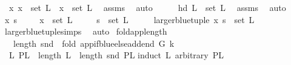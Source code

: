 \begin{isabellebody}
\ {\isachardoublequoteopen}\ {\isasymAnd}x{\isachardot}{\kern0pt}\ x\ {\isasymin}\ set\ L\ {\isasymLongrightarrow}\ x\ {\isasymin}\ set\ L{\isachardoublequoteclose}\ \isamarkupfalse%
\ assms\ \isamarkupfalse%
\ auto\isanewline
{}\isamarkupfalse%
\ \isanewline
\ \ \isamarkupfalse%
\ {\isachardoublequoteopen}hd\ L\ {\isasymin}\ set\ L{\isachardoublequoteclose}\ \isamarkupfalse%
\ assms\ \isamarkupfalse%
\ auto\isanewline
{}\isamarkupfalse%
\ \isanewline
\ \ \isamarkupfalse%
\ x\ s\ \isanewline
\ \ \isamarkupfalse%
\ {\isachardoublequoteopen}x\ {\isasymin}\ set\ L{\isachardoublequoteclose}\isanewline
\ \ \ \ \ {\isachardoublequoteopen}s\ {\isasymin}\ set\ L{\isachardoublequoteclose}\isanewline
\ \ \isamarkupfalse%
\ \isamarkupfalse%
\ {\isachardoublequoteopen}larger{\isacharunderscore}{\kern0pt}blue{\isacharunderscore}{\kern0pt}tuple\ x\ s\ {\isasymin}\ set\ L{\isachardoublequoteclose}\ \isamarkupfalse%
\ larger{\isacharunderscore}{\kern0pt}blue{\isacharunderscore}{\kern0pt}tuple{\isachardot}{\kern0pt}simps\ \isamarkupfalse%
\ auto\isanewline
{}\isamarkupfalse%
%
\endisatagproof
{\isafoldproof}%
%
\isadelimproof
%
\endisadelimproof
%
\isadelimdocument
%
\endisadelimdocument
%
\isatagdocument
%
\isamarkuptrue%
%
\endisatagdocument
{\isafolddocument}%
%
\isadelimdocument
%
\endisadelimdocument
{}\isamarkupfalse%
\ fold{\isacharunderscore}{\kern0pt}app{\isacharunderscore}{\kern0pt}length{\isacharcolon}{\kern0pt}\isanewline
\ \ \ {\isachardoublequoteopen}length\ {\isacharparenleft}{\kern0pt}snd\ \ {\isacharparenleft}{\kern0pt}fold\ {\isacharparenleft}{\kern0pt}app{\isacharunderscore}{\kern0pt}if{\isacharunderscore}{\kern0pt}blue{\isacharunderscore}{\kern0pt}else{\isacharunderscore}{\kern0pt}add{\isacharunderscore}{\kern0pt}end\ G\ k{\isacharparenright}{\kern0pt}\ \isanewline
\ \ L{}\ PL{}{\isacharparenright}{\kern0pt}{\isacharparenright}{\kern0pt}\ {\isacharequal}{\kern0pt}\ length\ L{}\ {\isacharplus}{\kern0pt}\ length\ {\isacharparenleft}{\kern0pt}snd\ PL{}{\isacharparenright}{\kern0pt}{\isachardoublequoteclose}\isanewline
%
\isadelimproof
%
\endisadelimproof
%
\isatagproof
{}\isamarkupfalse%
{\isacharparenleft}{\kern0pt}induct\ L{}\ arbitrary{\isacharcolon}{\kern0pt}\ PL{}{\isacharparenright}{\kern0pt}\isanewline

\end{isabellebody}
